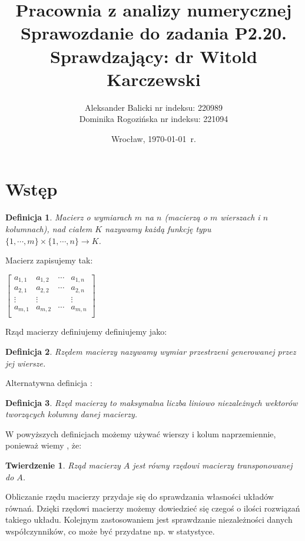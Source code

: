 \documentclass[a4paper,10pt]{article}
\title{{\textbf{Pracownia z analizy numerycznej}}\\[1ex]
       {\Large Sprawozdanie do zadania \textbf{P2.20.}}\\[-1ex]
       {\large Sprawdzający: dr Witold Karczewski}}
\author{Aleksander Balicki \large nr indeksu: 220989\\
	Dominika Rogozińska \large nr indeksu: 221094}
\date{Wrocław, \today\ r.}
\newtheorem{definition}{Definicja}
\newtheorem{theorem}{Twierdzenie}
\begin{document}
\maketitle

\section{Wstęp}
\setcounter{equation}{0}
\begin{definition}
	Macierz o wymiarach $m$ na $n$ (macierzą o $m$ wierszach i $n$ kolumnach), nad ciałem $K$ nazywamy każdą funkcję typu $\{1,\cdots,m\} \times \{1,\cdots,n\} \rightarrow K$.
\end{definition}
Macierz zapisujemy tak:
\begin{center}
	$ \left[ \begin{array}{cccc}
		a_{1,1} & a_{1,2} & \cdots & a_{1,n}\\
		a_{2,1} & a_{2,2} & \cdots & a_{2,n}\\
		\vdots  &  \vdots &        & \vdots \\
		a_{m,1} & a_{m,2} & \cdots & a_{m,n}\\
	\end{array} \right] $
\end{center}
Rząd macierzy definiujemy \cite{EK} definiujemy jako:
\begin{definition}
	Rzędem macierzy nazywamy wymiar przestrzeni generowanej przez jej wiersze.
\end{definition}
Alternatywna definicja \cite{Wi}:
\begin{definition}
	Rzęd macierzy to maksymalna liczba liniowo niezależnych wektorów tworzących kolumny danej macierzy.
\end{definition}

W powyższych definicjach możemy używać wierszy i kolum naprzemiennie, ponieważ wiemy \cite{EK}, że:
\begin{theorem}
	Rząd macierzy $A$ jest równy rzędowi macierzy transponowanej do $A$.
\end{theorem}

Obliczanie rzędu macierzy przydaje się do sprawdzania własności układów równań.
Dzięki rzędowi macierzy możemy dowiedzieć się czegoś o ilości rozwiązań takiego układu.
Kolejnym zastosowaniem jest sprawdzanie niezależności danych współczynników, co może być przydatne np. w statystyce.
\end{document}
